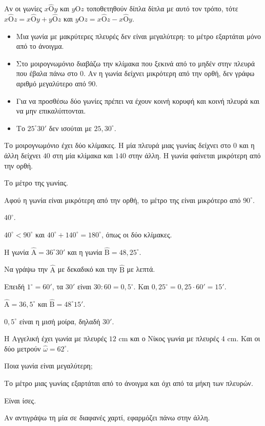 Αν οι γωνίες $x\hat{\mathrm{Ο}}y$ και $y\hat{\mathrm{Ο}}z$ τοποθετηθούν δίπλα δίπλα με αυτό τον τρόπο, τότε $x\hat{\mathrm{Ο}}z=x\hat{\mathrm{Ο}}y+y\hat{\mathrm{Ο}}z$ και $y\hat{\mathrm{Ο}}z=x\hat{\mathrm{Ο}}z-x\hat{\mathrm{Ο}}y$.

\begin{prosoxi}
\begin{itemize}[leftmargin=1.2em,itemsep=0.3ex,topsep=2pt]
\item Μια γωνία με μακρύτερες πλευρές δεν είναι μεγαλύτερη: το μέτρο εξαρτάται μόνο από το άνοιγμα.
\item Στο μοιρογνωμόνιο διαβάζω την κλίμακα που ξεκινά από το μηδέν στην πλευρά που έβαλα πάνω στο $0$. Αν η γωνία δείχνει μικρότερη από την ορθή, δεν γράφω αριθμό μεγαλύτερο από $90$.
\item Για να προσθέσω δύο γωνίες πρέπει να έχουν κοινή κορυφή και κοινή πλευρά και να μην επικαλύπτονται.
\item Το $25^\circ30'$ δεν ισούται με $25{,}30^\circ$.
\end{itemize}
\end{prosoxi}


\tixero Το μοιρογνωμόνιο έχει δύο κλίμακες. Η μία πλευρά μιας γωνίας δείχνει στο $0$ και η άλλη δείχνει $40$ στη μία κλίμακα και $140$ στην άλλη. Η γωνία φαίνεται μικρότερη από την ορθή.\par
\tithelo Το μέτρο της γωνίας.\par
\possindeo Αφού η γωνία είναι μικρότερη από την ορθή, το μέτρο της είναι μικρότερο από $90^\circ$.\par
\apantisi $40^\circ$.\par
\elegxos $40^\circ<90^\circ$ και $40^\circ+140^\circ=180^\circ$, όπως οι δύο κλίμακες.

\tixero Η γωνία $\hat{\mathrm{Α}}=36^\circ30'$ και η γωνία $\hat{\mathrm{Β}}=48{,}25^\circ$.\par
\tithelo Να γράψω την $\hat{\mathrm{Α}}$ με δεκαδικό και την $\hat{\mathrm{Β}}$ με λεπτά.\par
\possindeo Επειδή $1^\circ=60'$, τα $30'$ είναι $30:60=0{,}5^\circ$. Και $0{,}25^\circ=0{,}25\cdot60'=15'$.\par
\apantisi $\hat{\mathrm{Α}}=36{,}5^\circ$ και $\hat{\mathrm{Β}}=48^\circ15'$.\par
\elegxos $0{,}5^\circ$ είναι η μισή μοίρα, δηλαδή $30'$.

\tixero Η Αγγελική έχει γωνία με πλευρές $12$ cm και ο Νίκος γωνία με πλευρές $4$ cm. Και οι δύο μετρούν $\hat{\omega}=62^\circ$.\par
\tithelo Ποια γωνία είναι μεγαλύτερη;\par
\possindeo Το μέτρο μιας γωνίας εξαρτάται από το άνοιγμα και όχι από τα μήκη των πλευρών.\par
\apantisi Είναι ίσες.\par
\elegxos Αν αντιγράψω τη μία σε διαφανές χαρτί, εφαρμόζει πάνω στην άλλη.

